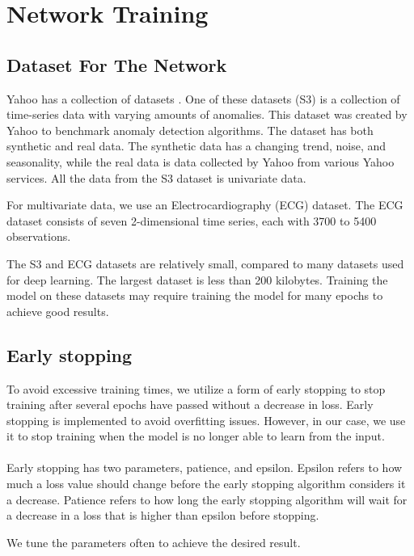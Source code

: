 

\section{Network Training}

\subsection{Dataset For The Network}
Yahoo has a collection of datasets \cite{yahoo_datasets}. One of these datasets (S3) is a collection of time-series data with varying amounts of anomalies. This dataset was created by Yahoo to benchmark anomaly detection algorithms. The dataset has both synthetic and real data. The synthetic data has a changing trend, noise, and seasonality, while the real data is data collected by Yahoo from various Yahoo services. All the data from the S3 dataset is univariate data.

For multivariate data, we use an Electrocardiography (ECG) dataset. The ECG dataset consists of seven 2-dimensional time series, each with 3700 to 5400 observations.

The S3 and ECG datasets are relatively small, compared to many datasets used for deep learning. The largest dataset is less than 200 kilobytes. Training the model on these datasets may require training the model for many epochs to achieve good results.

\subsection{Early stopping}
To avoid excessive training times, we utilize a form of early stopping to stop training after several epochs have passed without a decrease in loss. Early stopping is implemented to avoid overfitting issues. However, in our case, we use it to stop training when the model is no longer able to learn from the input.
\\\\
Early stopping has two parameters, patience, and epsilon. Epsilon refers to how much a loss value should change before the early stopping algorithm considers it a decrease. Patience refers to how long the early stopping algorithm will wait for a decrease in a loss that is higher than epsilon before stopping.

We tune the parameters often to achieve the desired result.

